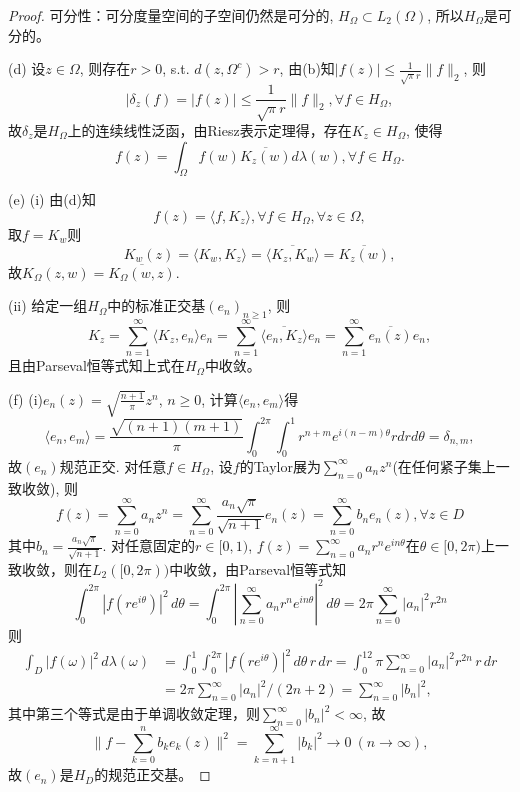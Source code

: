\documentclass[a4paper,8pt]{ctexart}\textwidth 140mm \textheight 216mm
\newcommand{\8}{\infty}
\newcommand{\la}{\langle}
\newcommand{\ra}{\rangle}
\begin{document}
\begin{proof}
	可分性：可分度量空间的子空间仍然是可分的, $H_\Omega\subset L_2(\Omega)$, 所以$H_\Omega$是可分的。
	
	(d) 设$z\in\Omega$, 则存在$r>0$, s.t. $d(z,\Omega^c)>r$, 由(b)知$|f(z)|\leq \frac{1}{\sqrt{\pi}r}\|f\|_2$, 则
	\begin{equation*}
	|\delta_z(f)=|f(z)|\leq \frac{1}{\sqrt{\pi}r}\|f\|_2,\forall f\in H_\Omega,
	\end{equation*} 
	故$\delta_z$是$H_\Omega$上的连续线性泛函，由Riesz表示定理得，存在$K_z\in H_\Omega$, 使得
	$$f(z)=\int_\Omega f(w)\overline{K_z(w)}d\lambda(w),\forall f\in H_\Omega.$$
	
	(e) (i) 由(d)知 
	$$f(z)=\la f,K_z\ra,\forall f\in H_\Omega, \forall z\in\Omega,$$
	取$f=K_w$则
	$$K_w(z)=\la K_w,K_z\ra=\overline{\la K_z,K_w\ra}=\overline{K_z(w)},$$
	故$K_\Omega(z,w)=\overline{K_\Omega(w,z)}$.
	
	(ii) 给定一组$H_\Omega$中的标准正交基$(e_n)_{n\geq 1}$, 则
	$$K_z=\sum_{n=1}^\infty\la K_z,e_n\ra e_n=\sum_{n=1}^\infty \overline{\la e_n,K_z\ra}e_n=\sum_{n=1}^\infty \overline{e_n(z)}e_n,$$
	且由Parseval恒等式知上式在$H_\Omega$中收敛。
	
	(f) (i)$e_n(z)=\sqrt{\frac{n+1}{\pi}}z^n$, $n\geq 0$, 计算$\la e_n,e_m\ra$得
	$$\la e_n,e_m\ra=\frac{\sqrt{(n+1)(m+1)}}{\pi}\int_0^{2\pi}\int_0^1 r^{n+m}e^{i(n-m)\theta}rdr d\theta=\delta_{n,m},$$
	故$(e_n)$规范正交. 对任意$f\in H_\Omega$, 设$f$的Taylor展为$\sum_{n=0}^{\infty}a_nz^n$(在任何紧子集上一致收敛), 则
	\[
	f(z)=\sum_{n=0}^{\infty} a_nz^n=\sum_{n=0}^{\infty}\frac{a_n\sqrt{\pi}}{\sqrt{n+1}}e_n(z)=\sum_{n=0}^{\infty} b_ne_n(z),\forall z\in D
	\]
	其中$b_n=\frac{a_n\sqrt{\pi}}{\sqrt{n+1}}$. 对任意固定的$r\in[0,1)$, $f(z)=\sum_{n=0}^{\infty} a_nr^ne^{in\theta}$在$\theta\in [0,2\pi)$上一致收敛，则在$L_2([0,2\pi))$中收敛，由Parseval恒等式知
	\[
	\int_0^{2\pi} |f(re^{i\theta})|^2\, d\theta=\int_0^{2\pi}|\sum_{n=0}^{\infty}a_nr^ne^{in\theta}|^2\, d\theta=2\pi\sum_{n=0}^{\infty}|a_n|^2r^{2n}
	\]
	则%
	\[\begin{split}
	\int_{D}|f(\omega)|^2\, d\lambda(\omega) &= \int_0^1 \int_0^{2\pi} |f(re^{i\theta})|^2\, d\theta \, r\, dr = \int_0^12\pi\sum_{n=0}^{\infty}|a_n|^2r^{2n}\, r\, dr\\
	&=2\pi \sum_{n=0}^{\infty}|a_n|^2/(2n+2)=\sum_{n=0}^{\infty}|b_n|^2,
	\end{split}
	\]
	其中第三个等式是由于单调收敛定理，则$\sum_{n=0}^{\infty}|b_n|^2<\infty$, 故
	\[
	\|f-\sum_{k=0}^nb_ke_k(z)\|^2=\sum_{k=n+1}^{\infty}|b_k|^2\to 0\ (n\to\infty),
	\]
	故$(e_n)$是$H_D$的规范正交基。
	

\end{proof}
\end{document}
